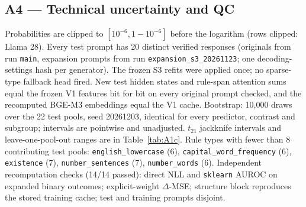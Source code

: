 \subsection*{A4 --- Technical uncertainty and QC}
Probabilities are clipped to $[10^{-6}, 1-10^{-6}]$ before the logarithm (rows clipped: Llama 28). Every test prompt has 20 distinct verified responses (originals from run \texttt{main}, expansion prompts from run \texttt{expansion\_s3\_20261123}; one decoding-settings hash per generator). The frozen S3 refits were applied once; no sparse-type fallback head fired. New test hidden states and rule-span attention sums equal the frozen V1 features bit for bit on every original prompt checked, and the recomputed BGE-M3 embeddings equal the V1 cache. Bootstrap: 10,000 draws over the 22 test pools, seed 20261203, identical for every predictor, contrast and subgroup; intervals are pointwise and unadjusted. $t_{21}$ jackknife intervals and leave-one-pool-out ranges are in Table~\ref{tab:A1c}. Rule types with fewer than 8 contributing test pools: \texttt{english\_lowercase} (6), \texttt{capital\_word\_frequency} (6), \texttt{existence} (7), \texttt{number\_sentences} (7), \texttt{number\_words} (6). Independent recomputation checks (14/14 passed): direct NLL and \texttt{sklearn} AUROC on expanded binary outcomes; explicit-weight $\Delta$-MSE; structure block reproduces the stored training cache; test and training prompts disjoint.

